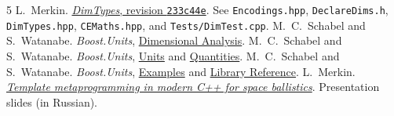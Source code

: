 \documentclass[11pt,a4paper]{article}
\newcommand{\code}[1]{\texttt{#1}}
\begin{document}
\begingroup\small
\begin{thebibliography}{5}\setlength{\itemsep}{1pt}\setlength{\parskip}{0pt}
 L.~Merkin. \href{https://github.com/LMerkin/DimTypes/tree/233c44e95650cc575bd5f9fe99b2256281aa3965}{\emph{DimTypes}, revision \texttt{233c44e}}.
See \code{Encodings.hpp}, \code{DeclareDims.h}, \code{DimTypes.hpp},
\code{CEMaths.hpp}, and \code{Tests/DimTest.cpp}.
 M.~C.~Schabel and S.~Watanabe. \emph{Boost.Units},
\href{https://www.boost.org/doc/libs/latest/doc/html/boost_units/Dimensional_Analysis.html}{Dimensional Analysis}.
 M.~C.~Schabel and S.~Watanabe. \emph{Boost.Units},
\href{https://www.boost.org/doc/libs/latest/doc/html/boost_units/Units.html}{Units} and
\href{https://www.boost.org/doc/libs/latest/doc/html/boost_units/Quantities.html}{Quantities}.
 M.~C.~Schabel and S.~Watanabe. \emph{Boost.Units},
\href{https://www.boost.org/doc/libs/latest/doc/html/boost_units/Examples.html}{Examples} and
\href{https://www.boost.org/doc/libs/latest/doc/html/boost_units/Reference.html}{Library Reference}.
 L.~Merkin.
\href{https://meetups.yadro.com/static/documents/template_metaprogramming_in_modern_cpp_for_space_ballistics_problems_merkin.pdf}{\emph{Template metaprogramming in modern C++ for space ballistics}}.
Presentation slides (in Russian).
\end{thebibliography}
\endgroup
\end{document}
